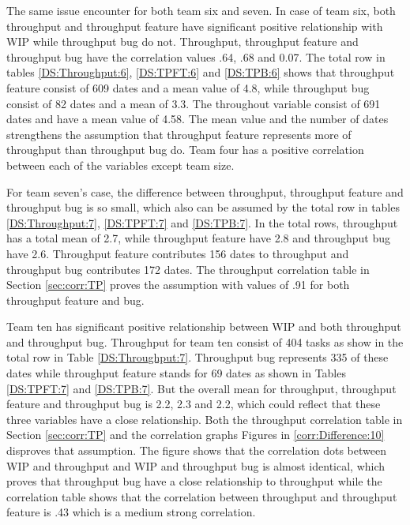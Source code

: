 \documentclass[UKenglish]{ifimaster}  %
\begin{document}
The same issue encounter for both team six and seven. In case of team six, both throughput and throughput feature have significant positive relationship with WIP while throughput bug do not. Throughput, throughput feature and throughput bug have the correlation values .64, .68 and 0.07. The total row in tables \ref{DS:Throughput:6},  \ref{DS:TPFT:6} and \ref{DS:TPB:6} shows that throughput feature consist of 609 dates and a mean value of 4.8, while throughput bug consist of 82 dates  and a mean of 3.3. The throughout variable consist of 691 dates and have a mean value of 4.58. The mean value and the number of dates strengthens the assumption that throughput feature represents more of throughput than throughput bug do.  Team four has a positive correlation between each of the variables except team size.

For team seven's case, the difference between throughput, throughput feature and throughput bug is so small, which also can be assumed by the total row in tables \ref{DS:Throughput:7},  \ref{DS:TPFT:7} and \ref{DS:TPB:7}. In the total rows, throughput has a total mean of 2.7, while throughput feature have 2.8 and throughput bug have 2.6. Throughput feature contributes 156 dates to throughput and throughput bug contributes 172 dates. The throughput correlation table in Section \ref{sec:corr:TP} proves the assumption with values of .91 for both throughput feature and bug.  

Team ten has significant positive relationship between WIP and both throughput and throughput bug. Throughput for team ten consist of 404 tasks as show in the total row in Table \ref{DS:Throughput:7}. Throughput bug represents 335 of these dates while throughput feature stands for 69 dates as shown in Tables \ref{DS:TPFT:7} and \ref{DS:TPB:7}. But the overall mean for throughput, throughput feature and throughput bug is 2.2, 2.3 and 2.2, which could reflect that these three variables have a close relationship. Both the throughput correlation table in Section \ref{sec:corr:TP} and the correlation graphs Figures in \ref{corr:Difference:10} disproves that assumption. The figure shows that the correlation dots between WIP and throughput and WIP and throughput bug is almost identical, which proves that throughput bug have a close relationship to throughput while the correlation table shows that the correlation between throughput and throughput feature is .43 which is a medium strong correlation. 
\end{document}
